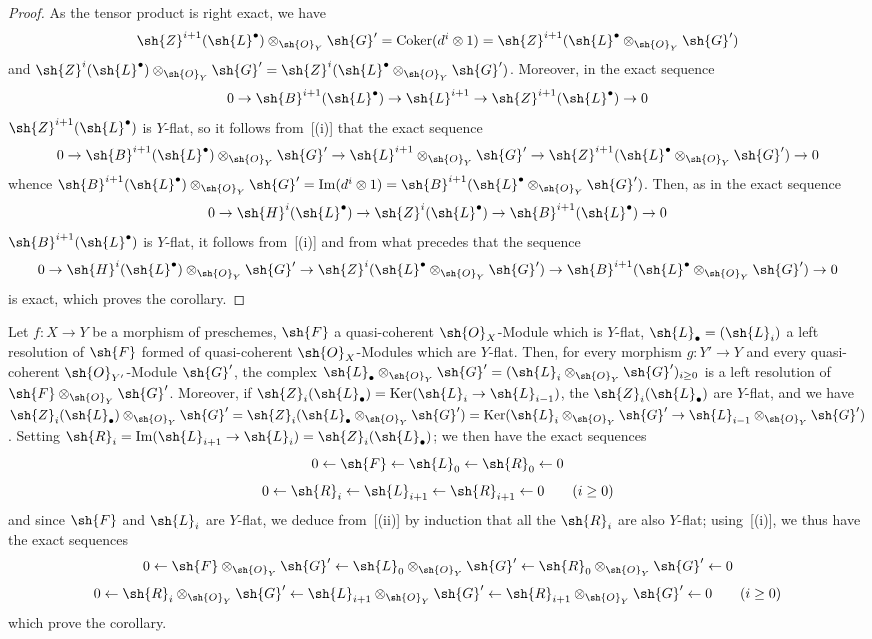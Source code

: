 \begin{proof}
As the tensor product is right exact, we have
\[
  \sh{Z}^{i+1}(\sh{L}^\bullet)\otimes_{\sh{O}_Y}\sh{G}' = \operatorname{Coker}(d^i\otimes 1) = \sh{Z}^{i+1}(\sh{L}^\bullet\otimes_{\sh{O}_Y}\sh{G}')
\]
and $\sh{Z}^{i}(\sh{L}^\bullet)\otimes_{\sh{O}_Y}\sh{G}' = \sh{Z}^{i}(\sh{L}^\bullet\otimes_{\sh{O}_Y}\sh{G}')$.
Moreover, in the exact sequence
\[
  0\to\sh{B}^{i+1}(\sh{L}^\bullet)\to\sh{L}^{i+1}\to\sh{Z}^{i+1}(\sh{L}^\bullet)\to 0
\]
$\sh{Z}^{i+1}(\sh{L}^\bullet)$ is $Y$-flat, so it follows from~[(i)] that the exact sequence
\[
  0\to\sh{B}^{i+1}(\sh{L}^\bullet)\otimes_{\sh{O}_Y}\sh{G}'\to\sh{L}^{i+1}\otimes_{\sh{O}_Y}\sh{G}'\to\sh{Z}^{i+1}(\sh{L}^\bullet\otimes_{\sh{O}_Y}\sh{G}')\to 0
\]
whence $\sh{B}^{i+1}(\sh{L}^\bullet)\otimes_{\sh{O}_Y}\sh{G}'=\operatorname{Im}(d^i\otimes 1)=\sh{B}^{i+1}(\sh{L}^\bullet\otimes_{\sh{O}_Y}\sh{G}')$.
Then, as in the exact sequence
\[
  0\to\sh{H}^i(\sh{L}^\bullet)\to\sh{Z}^i(\sh{L}^\bullet)\to\sh{B}^{i+1}(\sh{L}^\bullet)\to 0
\]
$\sh{B}^{i+1}(\sh{L}^\bullet)$ is $Y$-flat, it follows from~[(i)] and from what precedes that the sequence
\[
  0\to\sh{H}^i(\sh{L}^\bullet)\otimes_{\sh{O}_Y}\sh{G}'\to\sh{Z}^i(\sh{L}^\bullet\otimes_{\sh{O}_Y}\sh{G}')\to\sh{B}^{i+1}(\sh{L}^\bullet\otimes_{\sh{O}_Y}\sh{G}')\to 0
\]
is exact, which proves the corollary.
\end{proof}

\begin{corollary}[2.1.10]
\label{IV.2.1.10}
Let $f:X\to Y$ be a morphism of preschemes, $\sh{F}$ a quasi-coherent $\sh{O}_X$-Module which is $Y$-flat, $\sh{L}_\bullet=(\sh{L}_i)$ a left resolution of $\sh{F}$ formed of quasi-coherent $\sh{O}_X$-Modules which are $Y$-flat.
Then, for every morphism $g:Y'\to Y$ and every quasi-coherent $\sh{O}_{Y'}$-Module $\sh{G}'$, the complex $\sh{L}_\bullet\otimes_{\sh{O}_Y}\sh{G}'=(\sh{L}_i\otimes_{\sh{O}_Y}\sh{G}')_{i\geq 0}$ is a left resolution of $\sh{F}\otimes_{\sh{O}_Y}\sh{G}'$.
Moreover, if $\sh{Z}_i(\sh{L}_\bullet)=\operatorname{Ker}(\sh{L}_i\to\sh{L}_{i-1})$, the $\sh{Z}_i(\sh{L}_\bullet)$ are $Y$-flat, and we have $\sh{Z}_i(\sh{L}_\bullet)\otimes_{\sh{O}_Y}\sh{G}'=\sh{Z}_i(\sh{L}_\bullet\otimes_{\sh{O}_Y}\sh{G}')=\operatorname{Ker}(\sh{L}_i\otimes_{\sh{O}_Y}\sh{G}'\to\sh{L}_{i-1}\otimes_{\sh{O}_Y}\sh{G}')$.
Setting $\sh{R}_i=\operatorname{Im}(\sh{L}_{i+1}\to\sh{L}_i)=\sh{Z}_i(\sh{L}_\bullet)$; we then have the exact sequences
\[
  0\leftarrow\sh{F}\leftarrow\sh{L}_0\leftarrow\sh{R}_0\leftarrow 0
\]
\[
  0\leftarrow\sh{R}_i\leftarrow\sh{L}_{i+1}\leftarrow\sh{R}_{i+1}\leftarrow 0 \qquad (i\geq 0)
\]
and since $\sh{F}$ and $\sh{L}_i$ are $Y$-flat, we deduce from~[(ii)] by induction that all the $\sh{R}_i$ are also $Y$-flat; using~[(i)], we thus have the exact sequences
\[
  0\leftarrow\sh{F}\otimes_{\sh{O}_Y}\sh{G}'\leftarrow\sh{L}_0\otimes_{\sh{O}_Y}\sh{G}'\leftarrow\sh{R}_0\otimes_{\sh{O}_Y}\sh{G}'\leftarrow 0
\]
\[
  0\leftarrow\sh{R}_i\otimes_{\sh{O}_Y}\sh{G}'\leftarrow\sh{L}_{i+1}\otimes_{\sh{O}_Y}\sh{G}'\leftarrow\sh{R}_{i+1}\otimes_{\sh{O}_Y}\sh{G}'\leftarrow 0 \qquad (i\geq 0)
\]
which prove the corollary.
\end{corollary}

